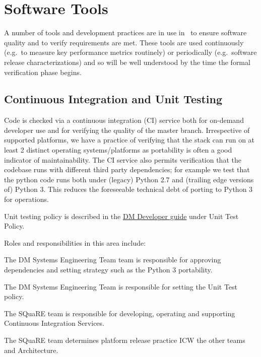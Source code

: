 \section{Software Tools}

A number of tools and development practices are in use in \product\ to ensure software quality and to verify requirements are met. These tools are used continuously (e.g.\ to measure key performance metrics routinely) or periodically (e.g.\ software release characterizations) and so will be well understood by the time the formal verification phase begins.

\subsection{Continuous Integration and Unit Testing}

Code is checked via a continuous integration (CI) service both for on-demand developer use and for verifying the quality of the master branch. Irrespective of supported platforms, we have a practice of verifying that the stack can run on at least 2 distinct operating systems/platforms as portability is often a good indicator of maintainability. The CI service also permits verification that the codebase runs with different third party dependencies; for example we test that the python code runs both under (legacy) Python 2.7 and (trailing edge versions of) Python 3. This reduces the foreseeable technical debt of porting to Python 3 for operations.

Unit testing policy is described in the \href{https://developer.lsst.io}{DM Developer guide} under Unit Test Policy.

Roles and responsibilities in this area include:

\begin{itemize_single}

\item The DM Systems Engineering Team  team is responsible for approving dependencies and setting strategy such as the Python 3 portability.

\item The DM Systems Engineering  Team is responsible for setting the Unit Test policy.

\item The SQuaRE team is responsible for developing, operating and supporting Continuous Integration Services.

\item The SQuaRE team determines platform release practice ICW the other teams and Architecture.

\end{itemize_single}

